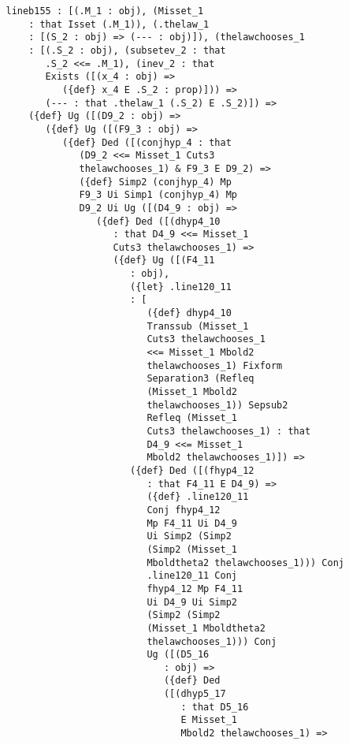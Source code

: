 \documentclass[12pt]{article}
\begin{document}
\begin{verbatim}
   lineb155 : [(.M_1 : obj), (Misset_1 
       : that Isset (.M_1)), (.thelaw_1 
       : [(S_2 : obj) => (--- : obj)]), (thelawchooses_1 
       : [(.S_2 : obj), (subsetev_2 : that 
          .S_2 <<= .M_1), (inev_2 : that 
          Exists ([(x_4 : obj) => 
             ({def} x_4 E .S_2 : prop)])) => 
          (--- : that .thelaw_1 (.S_2) E .S_2)]) => 
       ({def} Ug ([(D9_2 : obj) => 
          ({def} Ug ([(F9_3 : obj) => 
             ({def} Ded ([(conjhyp_4 : that 
                (D9_2 <<= Misset_1 Cuts3 
                thelawchooses_1) & F9_3 E D9_2) => 
                ({def} Simp2 (conjhyp_4) Mp 
                F9_3 Ui Simp1 (conjhyp_4) Mp 
                D9_2 Ui Ug ([(D4_9 : obj) => 
                   ({def} Ded ([(dhyp4_10 
                      : that D4_9 <<= Misset_1 
                      Cuts3 thelawchooses_1) => 
                      ({def} Ug ([(F4_11 
                         : obj), 
                         ({let} .line120_11 
                         : [
                            ({def} dhyp4_10 
                            Transsub (Misset_1 
                            Cuts3 thelawchooses_1 
                            <<= Misset_1 Mbold2 
                            thelawchooses_1) Fixform 
                            Separation3 (Refleq 
                            (Misset_1 Mbold2 
                            thelawchooses_1)) Sepsub2 
                            Refleq (Misset_1 
                            Cuts3 thelawchooses_1) : that 
                            D4_9 <<= Misset_1 
                            Mbold2 thelawchooses_1)]) => 
                         ({def} Ded ([(fhyp4_12 
                            : that F4_11 E D4_9) => 
                            ({def} .line120_11 
                            Conj fhyp4_12 
                            Mp F4_11 Ui D4_9 
                            Ui Simp2 (Simp2 
                            (Simp2 (Misset_1 
                            Mboldtheta2 thelawchooses_1))) Conj 
                            .line120_11 Conj 
                            fhyp4_12 Mp F4_11 
                            Ui D4_9 Ui Simp2 
                            (Simp2 (Simp2 
                            (Misset_1 Mboldtheta2 
                            thelawchooses_1))) Conj 
                            Ug ([(D5_16 
                               : obj) => 
                               ({def} Ded 
                               ([(dhyp5_17 
                                  : that D5_16 
                                  E Misset_1 
                                  Mbold2 thelawchooses_1) => 

\end{verbatim}
\end{document}
